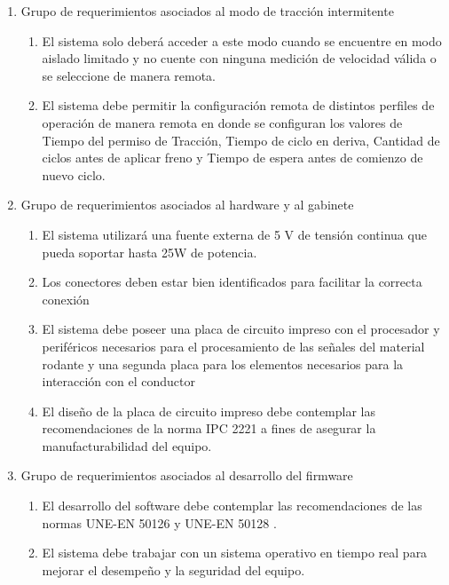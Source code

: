 \begin{enumerate}
    \item Grupo de requerimientos asociados al modo de tracción intermitente
    \begin{enumerate}
        \item El sistema solo deberá acceder a este modo cuando se encuentre en modo aislado limitado y no cuente con ninguna medición de velocidad válida o se seleccione de manera remota.
        \item El sistema debe permitir la configuración remota de distintos perfiles de operación de manera remota en donde se configuran los valores de Tiempo del permiso de Tracción, Tiempo de ciclo en deriva, Cantidad de ciclos antes de aplicar freno y Tiempo de espera antes de comienzo de nuevo ciclo.
    \end{enumerate}
       \vspace{1cm}
    \item Grupo de requerimientos asociados al hardware y al gabinete
    \begin{enumerate}
        \item El sistema utilizará una fuente externa de 5 V de tensión continua que pueda soportar hasta 25W de potencia.
        \item Los conectores deben estar bien identificados para facilitar la correcta conexión
        \item El sistema debe poseer una placa de circuito impreso con el procesador y periféricos necesarios para el procesamiento de las señales del material rodante y una segunda placa para los elementos necesarios para la interacción con el conductor
        \item El diseño de la placa de circuito impreso debe contemplar las recomendaciones de la norma IPC 2221 \cite{norma_ipc2221} a fines de asegurar la manufacturabilidad del equipo. 
    \end{enumerate}
           
    \item Grupo de requerimientos asociados al desarrollo del firmware
    \begin{enumerate}
        \item El desarrollo del software debe contemplar las recomendaciones de las normas UNE-EN 50126 y UNE-EN 50128 \cite{norma_50128}.
        \item El sistema debe trabajar con un sistema operativo en tiempo real para mejorar el desempeño y la seguridad del equipo.
    \end{enumerate}
\end{enumerate}